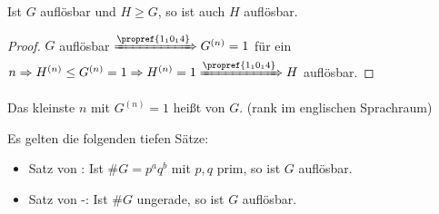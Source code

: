 \begin{conclusion}
	Ist $G$ auflösbar und $H \geq G$, so ist auch $H$ auflösbar.
\end{conclusion}

\begin{proof}
	$G$ auflösbar $\xRightarrow{\propref{1_10_14}} G^{(n)} = 1$ für ein $n \Rightarrow H^{(n)} \leq G^{(n)} = 1 \Rightarrow H^{(n)} = 1 \xRightarrow{\propref{1_10_14}} H$ auflösbar.
\end{proof}

\begin{remark}
	Das kleinste $n$ mit $G^{(n)} = 1$ heißt  von $G$. (rank im englischen Sprachraum)
\end{remark}

\begin{remark}
	Es gelten die folgenden tiefen Sätze:
	\begin{itemize}
		\item Satz von : Ist $\#G = p^{a}q^{b}$ mit $p,q$ prim, so ist $G$ auflösbar.
		\item Satz von -: Ist $\#G$ ungerade, so ist $G$ auflösbar.
	\end{itemize}
\end{remark}
